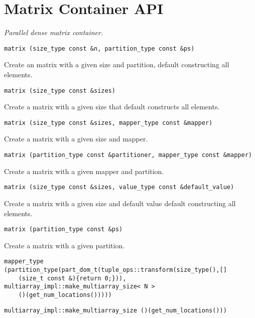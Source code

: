 \section { Matrix Container API } \label{sec-mat-cont}

\emph { Parallel dense matrix container.  }

\begin{verbatim}
matrix (size_type const &n, partition_type const &ps)
\end{verbatim}

Create an matrix with a given size and partition, default constructing all elements. 
 
\begin{verbatim}
matrix (size_type const &sizes)
\end{verbatim}

Create a matrix with a given size that default constructs all elements. 
 
\begin{verbatim}
matrix (size_type const &sizes, mapper_type const &mapper)
\end{verbatim}

Create a matrix with a given size and mapper. 
 
\begin{verbatim}
matrix (partition_type const &partitioner, mapper_type const &mapper)
\end{verbatim}

Create a matrix with a given mapper and partition. 
 
\begin{verbatim}
matrix (size_type const &sizes, value_type const &default_value)
\end{verbatim}

Create a matrix with a given size and default value default constructing all elements. 
 
\begin{verbatim}
matrix (partition_type const &ps)
\end{verbatim}

Create a matrix with a given partition. 
 
\begin{verbatim}
mapper_type (partition_type(part_dom_t(tuple_ops::transform(size_type(),[]
    (size_t const &){return 0;})), multiarray_impl::make_multiarray_size< N >
    ()(get_num_locations()))))
\end{verbatim}
 
\begin{verbatim}
multiarray_impl::make_multiarray_size ()(get_num_locations()))
\end{verbatim}

